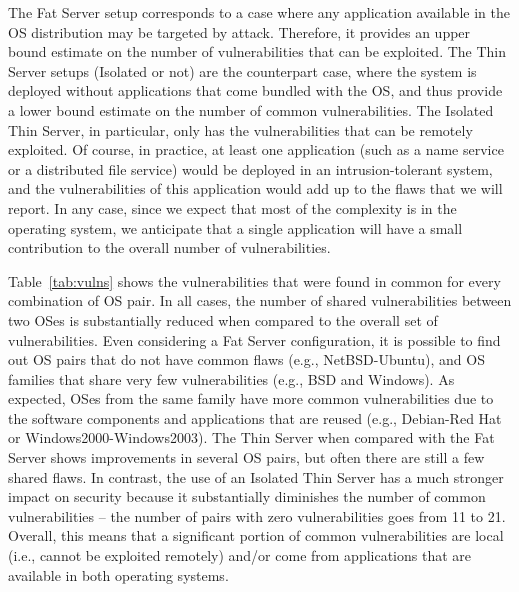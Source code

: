 The Fat Server setup corresponds to a case where any application available in the OS distribution may be targeted by attack. Therefore, it provides an upper bound estimate on the number of vulnerabilities that can be exploited. The Thin Server setups (Isolated or not) are the counterpart case, where the system is deployed without applications that come bundled with the OS, and thus provide a lower bound estimate on the number of common vulnerabilities. The Isolated Thin Server, in particular, only has the vulnerabilities that can be remotely exploited. Of course, in practice, at least one application (such as a name service or a distributed file service) would be deployed in an intrusion-tolerant system, and the vulnerabilities of this application would add up to the flaws that we will report. In any case, since we expect that most of the complexity is in the operating system, we anticipate that a single application will have a small contribution to the overall number of vulnerabilities.


Table~\ref{tab:vulns} shows the vulnerabilities that were found in common for every combination of OS pair.
In all cases, the number of shared vulnerabilities between two OSes is substantially reduced when compared to the overall set of vulnerabilities. Even considering a Fat Server configuration, it is possible to find out OS pairs that do not have common flaws (e.g., NetBSD-Ubuntu), and OS families that share very few vulnerabilities (e.g., BSD and Windows). As expected, OSes from the same family have more common vulnerabilities due to the software components and applications that are reused (e.g., Debian-Red Hat or Windows2000-Windows2003). The Thin Server when compared with the Fat Server shows improvements in several OS pairs, but often there are still a few shared flaws. In contrast, the use of an Isolated Thin Server has a much stronger impact on security because it substantially diminishes the number of common vulnerabilities -- the number of pairs with zero vulnerabilities goes from 11 to 21. Overall, this means that a significant portion of common vulnerabilities are local (i.e., cannot be exploited remotely) and/or come from applications that are available in both operating systems.

